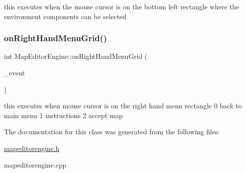 this executes when the mouse cursor is on the bottom left rectangle where the environment components can be selected \hypertarget{class_map_editor_engine_a5cac60e9a046a903de4a1f570b15bb29}{}\label{class_map_editor_engine_a5cac60e9a046a903de4a1f570b15bb29} 
\subsubsection{\texorpdfstring{on\+Right\+Hand\+Menu\+Grid()}{onRightHandMenuGrid()}}
{\footnotesize\ttfamily int Map\+Editor\+Engine\+::on\+Right\+Hand\+Menu\+Grid (\begin{DoxyParamCaption}\item[{S\+D\+L\+\_\+\+Event $\ast$}]{\+\_\+event }\end{DoxyParamCaption})}

this executes when mouse cursor is on the right hand menu rectangle 0 back to main menu 1 instructions 2 accept map 

The documentation for this class was generated from the following files\+:\begin{DoxyCompactItemize}
\item 
\hyperlink{mapeditorengine_8h}{mapeditorengine.\+h}\item 
mapeditorengine.\+cpp\end{DoxyCompactItemize}
